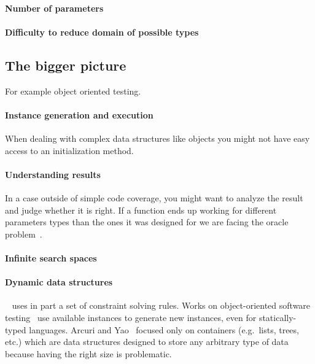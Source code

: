 \documentclass{llncs2e/llncs}
\begin{document}
\paragraph{Number of parameters}

\paragraph{Difficulty to reduce domain of possible types}

\subsection{The bigger picture}
For example object oriented testing.
\paragraph{Instance generation and execution} When dealing with complex data
structures like objects you might not have easy access to an initialization
method.

\paragraph{Understanding results} In a case outside of simple code coverage, you
might want to analyze the result and judge whether it is right. If a function
ends up working for different parameters types than the ones it was designed for
we are facing the oracle problem~\cite{barr2015oracle}.

\paragraph{Infinite search spaces}

\paragraph{Dynamic data structures}~\cite{lakhotia2008handling} uses in part a
set of constraint solving rules. Works on object-oriented software
testing~\cite{tonella2004evolutionary,ciupa2008artoo} use available instances to
generate new instances, even for statically-typed languages. Arcuri and
Yao~\cite{arcuri2008search} focused only on containers (e.g.\ lists, trees,
etc.) which are data structures designed to store any arbitrary type of data
because having the right size is problematic.
\end{document}
